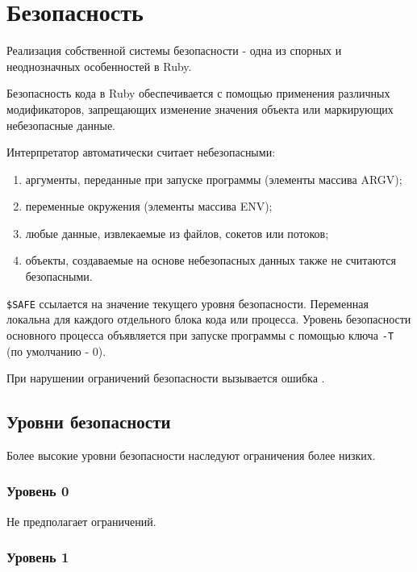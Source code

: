 \chapter{Безопасность}
 
Реализация собственной системы безопасности - одна из спорных и неоднозначных особенностей в Ruby. 

Безопасность кода в Ruby обеспечивается с помощью применения различных модификаторов, запрещающих изменение значения объекта или маркирующих небезопасные данные.

Интерпретатор автоматически считает небезопасными:
\begin{enumerate}
  \item аргументы, переданные при запуске программы (элементы массива ARGV);
  \item переменные окружения (элементы массива ENV);
  \item любые данные, извлекаемые из файлов, сокетов или потоков;
  \item объекты, создаваемые на основе небезопасных данных также не считаются безопасными.
\end{enumerate}

\verb!$SAFE! ссылается на значение текущего уровня безопасности. Переменная локальна для каждого отдельного блока кода или процесса. Уровень безопасности основного процесса объявляется при запуске программы с помощью ключа \verb!-T! (по умолчанию - 0).

При нарушении ограничений безопасности вызывается ошибка .

\section{Уровни безопасности}

Более высокие уровни безопасности наследуют ограничения более низких.

\subsection{Уровень 0}

Не предполагает ограничений.

\subsection{Уровень 1}

